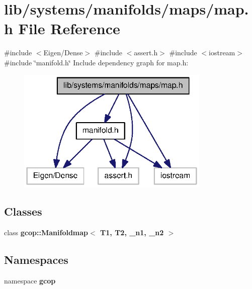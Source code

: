 \section{lib/systems/manifolds/maps/map.h \-File \-Reference}
\label{map_8h}
{\ttfamily \#include $<$\-Eigen/\-Dense$>$}\*
{\ttfamily \#include $<$assert.\-h$>$}\*
{\ttfamily \#include $<$iostream$>$}\*
{\ttfamily \#include \char`\"{}manifold.\-h\char`\"{}}\*
\-Include dependency graph for map.\-h\-:\nopagebreak
\begin{figure}[H]
\begin{center}
\leavevmode
\includegraphics[width=261pt]{map_8h__incl}
\end{center}
\end{figure}
\subsection*{\-Classes}
\begin{DoxyCompactItemize}
\item 
class {\bf gcop\-::\-Manifoldmap$<$ T1, T2, \-\_\-n1, \-\_\-n2 $>$}
\end{DoxyCompactItemize}
\subsection*{\-Namespaces}
\begin{DoxyCompactItemize}
\item 
namespace {\bf gcop}
\end{DoxyCompactItemize}
